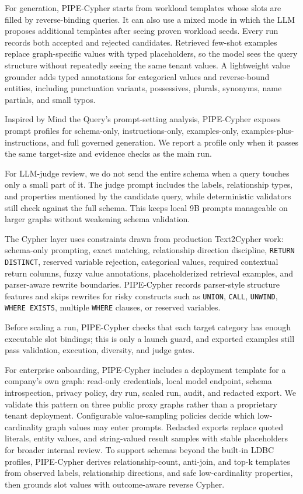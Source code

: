 \documentclass[11pt]{article}
\begin{document}
For generation, PIPE-Cypher starts from workload templates whose slots are filled by reverse-binding queries. It can also use a mixed mode in which the LLM proposes additional templates after seeing proven workload seeds. Every run records both accepted and rejected candidates. Retrieved few-shot examples replace graph-specific values with typed placeholders, so the model sees the query structure without repeatedly seeing the same tenant values. A lightweight value grounder adds typed annotations for categorical values and reverse-bound entities, including punctuation variants, possessives, plurals, synonyms, name partials, and small typos.

Inspired by Mind the Query's prompt-setting analysis, PIPE-Cypher exposes prompt profiles for schema-only, instructions-only, examples-only, examples-plus-instructions, and full governed generation. We report a profile only when it passes the same target-size and evidence checks as the main run.

For LLM-judge review, we do not send the entire schema when a query touches only a small part of it. The judge prompt includes the labels, relationship types, and properties mentioned by the candidate query, while deterministic validators still check against the full schema. This keeps local 9B prompts manageable on larger graphs without weakening schema validation.

The Cypher layer uses constraints drawn from production Text2Cypher work: schema-only prompting, exact matching, relationship direction discipline, \texttt{RETURN DISTINCT}, reserved variable rejection, categorical values, required contextual return columns, fuzzy value annotations, placeholderized retrieval examples, and parser-aware rewrite boundaries. PIPE-Cypher records parser-style structure features and skips rewrites for risky constructs such as \texttt{UNION}, \texttt{CALL}, \texttt{UNWIND}, \texttt{WHERE EXISTS}, multiple \texttt{WHERE} clauses, or reserved variables.

Before scaling a run, PIPE-Cypher checks that each target category has enough executable slot bindings; this is only a launch guard, and exported examples still pass validation, execution, diversity, and judge gates.

For enterprise onboarding, PIPE-Cypher includes a deployment template for a company's own graph: read-only credentials, local model endpoint, schema introspection, privacy policy, dry run, scaled run, audit, and redacted export. We validate this pattern on three public proxy graphs rather than a proprietary tenant deployment. Configurable value-sampling policies decide which low-cardinality graph values may enter prompts. Redacted exports replace quoted literals, entity values, and string-valued result samples with stable placeholders for broader internal review. To support schemas beyond the built-in LDBC profiles, PIPE-Cypher derives relationship-count, anti-join, and top-k templates from observed labels, relationship directions, and safe low-cardinality properties, then grounds slot values with outcome-aware reverse Cypher.
\end{document}
